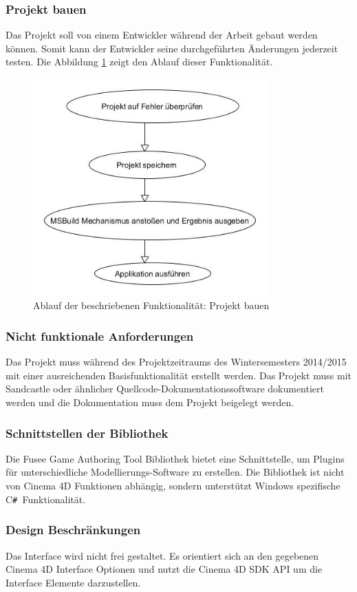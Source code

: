 \documentclass[pagesize, paper=a4, fontsize=12pt, titlepage=true, headings=small, headnosepline, abstractoff, liststotoc, nochapterprefix, plainheadsepline, twoside]{scrreprt}
\newcommand{\CSS}{C\texttt{\# }}
\begin{document}
\subsubsection{Projekt bauen}
Das Projekt soll von einem Entwickler während der Arbeit gebaut werden können. Somit kann der Entwickler seine durchgeführten Änderungen jederzeit testen. Die Abbildung \ref{re:projektbauen} zeigt den Ablauf dieser Funktionalität.
\begin{figure}[ht]
	\centering
	\includegraphics[width=9cm]{Bilder/ProjektBauen.jpg}
	\caption{Ablauf der beschriebenen Funktionalität: Projekt bauen}
	\label{re:projektbauen}
\end{figure}

\subsubsection{Nicht funktionale Anforderungen}
Das Projekt muss während des Projektzeitraums des Wintersemesters 2014/2015 mit einer ausreichenden Basisfunktionalität erstellt werden.
Das Projekt muss mit Sandcastle oder ähnlicher Quellcode-Dokumentationssoftware dokumentiert werden und die Dokumentation muss dem Projekt beigelegt werden.

\subsubsection{Schnittstellen der Bibliothek}
Die Fusee Game Authoring Tool Bibliothek bietet eine Schnittstelle, um Plugins für unterschiedliche Modellierungs-Software zu erstellen. Die Bibliothek ist nicht von Cinema 4D Funktionen abhängig, sondern unterstützt Windows spezifische \CSS Funktionalität. 

\subsubsection{Design Beschränkungen}
Das Interface wird nicht frei gestaltet. Es orientiert sich an den gegebenen Cinema 4D Interface Optionen und nutzt die Cinema 4D SDK API um die Interface Elemente darzustellen.
\end{document}

